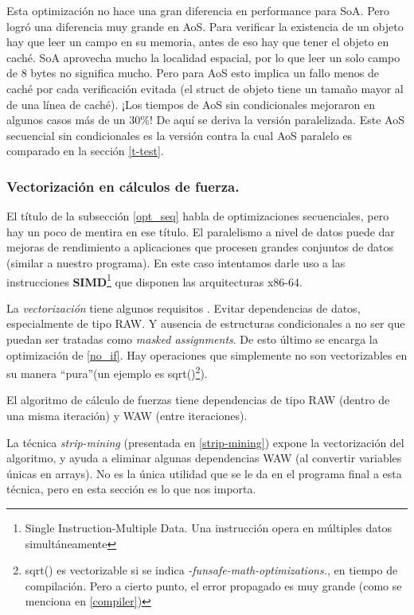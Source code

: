 \documentclass{article}
\begin{document}
Esta optimización no hace una gran diferencia en performance para SoA. Pero logró una diferencia muy grande en AoS. Para verificar la existencia de un objeto
hay que leer un campo en su memoria, antes de eso hay que tener el objeto en caché. SoA aprovecha mucho
la localidad espacial, por lo que leer un solo campo de 8 bytes no significa mucho. Pero para AoS esto
implica un fallo menos de caché por cada verificación evitada (el struct de objeto tiene un tamaño mayor al de una línea de caché). ¡Los tiempos
de AoS sin condicionales mejoraron en algunos casos más de un 30\%! De aquí se deriva la versión paralelizada. Este AoS
secuencial sin condicionales es la versión contra la cual AoS paralelo es comparado en la sección \ref{t-test}.

\subsubsection{Vectorización en cálculos de fuerza.\label{simd}}

El título de la subsección \ref{opt_seq} habla de optimizaciones secuenciales, pero hay un poco de mentira
en ese título. El paralelismo a nivel de datos puede dar mejoras de rendimiento a aplicaciones
que procesen grandes conjuntos de datos (similar a nuestro programa). En este caso intentamos darle uso a las
instrucciones \textbf{SIMD}\footnote{Single Instruction-Multiple Data. Una instrucción opera en múltiples datos simultáneamente} que disponen las arquitecturas x86-64.

La \textit{vectorización} tiene algunos requisitos \cite{intel_vec_guidelines}.
Evitar dependencias de datos, especialmente de tipo RAW. Y ausencia de estructuras condicionales a no ser
que puedan ser tratadas como \textit{masked assignments}. De esto último se encarga la optimización de \ref{no_if}.
Hay operaciones que simplemente no son vectorizables
en su manera ``pura''(un ejemplo es sqrt()\footnote{sqrt() es vectorizable si se indica \textit{-funsafe-math-optimizations.},
en tiempo de compilación. Pero a cierto punto, el error propagado es muy grande (como se menciona en \ref{compiler})}).


El algoritmo de cálculo de fuerzas tiene dependencias de tipo RAW (dentro de una misma iteración) y WAW (entre iteraciones).

La técnica \textit{strip-mining} (presentada en \ref{strip-mining}) expone la vectorización
del algoritmo, y ayuda a eliminar algunas dependencias WAW (al convertir variables únicas en arrays). No es
la única utilidad que se le da en el programa final a esta técnica, pero en esta sección es lo que nos importa.
\end{document}
